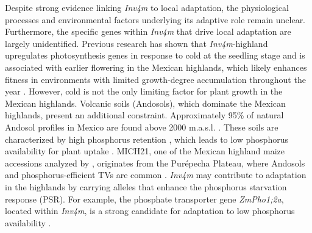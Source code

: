 \documentclass[9pt,twocolumn,twoside]{rilabRxiv}
\newcommand{\invfour}{\textit{Inv4m}\xspace}
\begin{document}
Despite strong evidence linking \invfour to local adaptation, the physiological processes and environmental factors underlying its adaptive role remain unclear.
Furthermore, the specific genes within \invfour that drive local adaptation are largely unidentified.
Previous research has shown that \invfour-highland upregulates photosynthesis genes in response to cold at the seedling stage \cite{crow2020} and is associated with earlier flowering in the Mexican highlands, which likely enhances fitness in environments with limited growth-degree accumulation throughout the year \cite{romeronavarro2017}.
However, cold is not the only limiting factor for plant growth in the Mexican highlands.
Volcanic soils (Andosols), which dominate the Mexican highlands, present an additional constraint.
Approximately 95\% of natural Andosol profiles in Mexico are found above 2000 m.a.s.l. \cite{paz-pellat2018,inegi2013}.
These soils are characterized by high phosphorus retention \cite{krasilnikov2013}, which leads to low phosphorus availability for plant uptake \cite{galvan-tejada2014}.
MICH21, one of the Mexican highland maize accessions analyzed by \cite{crow2020}, originates from the Purépecha Plateau, where Andosols and phosphorus-efficient TVs are common \cite{paz-pellat2018,galvan-tejada2014,bayuelo-jimenez2011,bayuelo-jimenez2014}.
\invfour may contribute to adaptation in the highlands by carrying alleles that enhance the phosphorus starvation response (PSR). For example, the phosphate transporter gene \textit{ZmPho1;2a}, located within \invfour, is a strong candidate for adaptation to low phosphorus availability \cite{salazar-vidal2016, Ma2021,zhang2014-ew}.  
\end{document}
